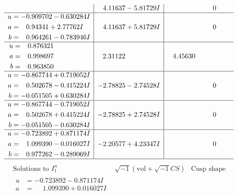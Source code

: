 \documentclass[1p]{elsarticle_modified}
\theoremstyle{definition}
\newcommand{\I}{\sqrt{-1}}
\begin{document}
$$\begin{array}{c|c|c}
 & \phantom{-}4.11637 - 5.81729 I & \phantom{-0.000000 } 0 \\ \hline\begin{aligned}
u &= -0.909702 - 0.630284 I \\
a &= \phantom{-}0.94341 + 2.77762 I \\
b &= \phantom{-}0.964261 - 0.783946 I\end{aligned}
 & \phantom{-}4.11637 + 5.81729 I & \phantom{-0.000000 } 0 \\ \hline\begin{aligned}
u &= \phantom{-}0.876321\phantom{ +0.000000I} \\
a &= \phantom{-}0.998697\phantom{ +0.000000I} \\
b &= \phantom{-}0.963850\phantom{ +0.000000I}\end{aligned}
 & \phantom{-}2.31122\phantom{ +0.000000I} & \phantom{-}4.45630\phantom{ +0.000000I} \\ \hline\begin{aligned}
u &= -0.867744 + 0.719052 I \\
a &= \phantom{-}0.502678 - 0.415224 I \\
b &= -0.051505 + 0.630284 I\end{aligned}
 & -2.78825 - 2.74528 I & \phantom{-0.000000 } 0 \\ \hline\begin{aligned}
u &= -0.867744 - 0.719052 I \\
a &= \phantom{-}0.502678 + 0.415224 I \\
b &= -0.051505 - 0.630284 I\end{aligned}
 & -2.78825 + 2.74528 I & \phantom{-0.000000 } 0 \\ \hline\begin{aligned}
u &= -0.723892 + 0.871174 I \\
a &= \phantom{-}1.099390 - 0.016027 I \\
b &= \phantom{-}0.977262 - 0.289069 I\end{aligned}
 & -2.20577 + 4.23347 I & \phantom{-0.000000 } 0\\
 \hline 
 \end{array}$$\newpage$$\begin{array}{c|c|c}  
\text{Solutions to }I^u_{1}& \I (\text{vol} + \sqrt{-1}CS) & \text{Cusp shape}\\
 \hline 
\begin{aligned}
u &= -0.723892 - 0.871174 I \\
a &= \phantom{-}1.099390 + 0.016027 I \\

\end{aligned}
\end{array}$$
\end{document}
